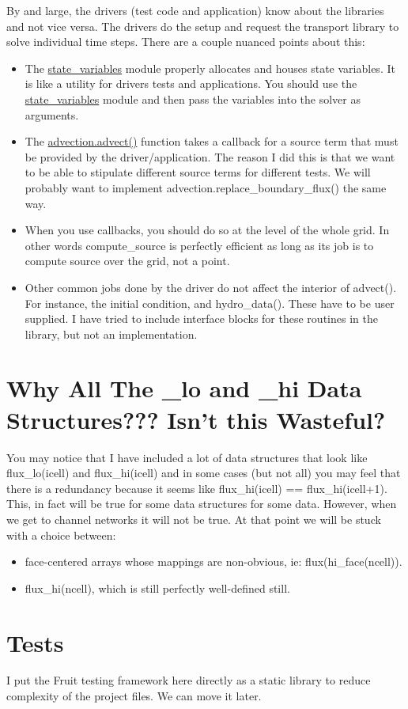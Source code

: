 By and large, the drivers (test code and application) know about the libraries and not vice versa. The drivers do the setup and request the transport library to solve individual time steps. There are a couple nuanced points about this:\begin{itemize}
\item The \hyperlink{a00070}{state\_\-variables} module properly allocates and houses state variables. It is like a utility for drivers tests and applications. You should use the \hyperlink{a00070}{state\_\-variables} module and then pass the variables into the solver as arguments.\item The \hyperlink{a00052_9ec45d9c2fabe0abb0a60795bc228f59}{advection.advect()} function takes a callback for a source term that must be provided by the driver/application. The reason I did this is that we want to be able to stipulate different source terms for different tests. We will probably want to implement advection.replace\_\-boundary\_\-flux() the same way.\item When you use callbacks, you should do so at the level of the whole grid. In other words compute\_\-source is perfectly efficient as long as its job is to compute source over the grid, not a point.\item Other common jobs done by the driver do not affect the interior of advect(). For instance, the initial condition, and hydro\_\-data(). These have to be user supplied. I have tried to include interface blocks for these routines in the library, but not an implementation.\end{itemize}
\hypertarget{index_faces}{}\section{Why All The \_\-lo and \_\-hi Data Structures??? Isn't this Wasteful?}\label{index_faces}
You may notice that I have included a lot of data structures that look like flux\_\-lo(icell) and flux\_\-hi(icell) and in some cases (but not all) you may feel that there is a redundancy because it seems like flux\_\-hi(icell) == flux\_\-hi(icell+1). This, in fact will be true for some data structures for some data. However, when we get to channel networks it will not be true. At that point we will be stuck with a choice between:\begin{itemize}
\item face-centered arrays whose mappings are non-obvious, ie: flux(hi\_\-face(ncell)).\item flux\_\-hi(ncell), which is still perfectly well-defined still.\end{itemize}
\hypertarget{index_tests}{}\section{Tests}\label{index_tests}
I put the Fruit testing framework here directly as a static library to reduce complexity of the project files. We can move it later.

